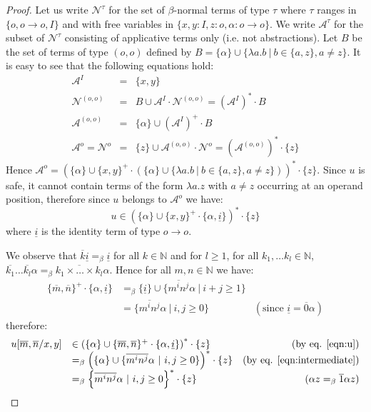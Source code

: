 \documentclass{llncs}
\newcommand{\encode}[1]{\overline{#1}} \newcommand\dps{\displaystyle}
\newcommand\union{\cup}
\newcommand\nat{\mathbb{N}}
\begin{document}
\begin{proof}
Let us write $\mathcal{N}^\tau$ for the set of $\beta$-normal terms of
type $\tau$ where $\tau$ ranges in $\{ o, o\rightarrow o, I \}$ and
with free variables in $\{ x,y:I, z:o, \alpha:o\rightarrow o\}$. We
write $\mathcal{A}^\tau$ for the subset of $\mathcal{N}^\tau$
consisting of applicative terms only (i.e. not abstractions).
Let $B$ be the set of terms of type $(o,o)$ defined by $B = \{ \alpha \} \union \{ \lambda a.b \ | \ b \in \{a,z\}, a \neq z \}$.
It is easy to see that the following equations hold:
\begin{eqnarray*}
\mathcal{A}^I &=& \{ x,y \} \\
\mathcal{N}^{(o,o)} &=& B \union \mathcal{A}^I \cdot
\mathcal{N}^{(o,o)} = (\mathcal{A}^I)^* \cdot B \\
\mathcal{A}^{(o,o)} &=& \{ \alpha \} \union (\mathcal{A}^I)^+ \cdot B \\
\mathcal{A}^o = \mathcal{N}^o &=& \{ z \} \union \mathcal{A}^{(o,o)} \cdot \mathcal{N}^o = (\mathcal{A}^{(o,o)})^* \cdot \{ z \}
\end{eqnarray*}
Hence $\mathcal{A}^o = \left( \{\alpha \} \union \{x,y\}^+ \cdot \left( \{\alpha \} \union \{\lambda a.b \ | \ b \in \{a,z\}, a \neq z \} \right) \right)^* \cdot \{ z \}$.
Since $u$ is safe, it cannot contain terms of the form $\lambda a . z$ with $a \neq z$ occurring at an operand position, therefore since $u$ belongs to $\mathcal{A}^o$ we have:
\begin{equation}
u \in \left( \{\alpha\} \union \{x,y\}^+ \cdot \{\alpha,
\underline{i} \} \right)^* \cdot \{ z \} \label{eqn:u}
\end{equation}
where $\underline{i}$ is the identity term of type $o\rightarrow o$.


We observe that $\encode{k} \underline{i} =_\beta \underline{i}$ for all $k \in \nat$ and for $l\geq 1$, for all $k_1, \ldots k_l \in \nat$,
$\encode{k_1}\ldots \encode{k_l} \alpha =_\beta
\encode{k_1\times \ldots \times k_l} \alpha$. Hence for all $m,n \in \nat$ we have:
\begin{equation}
\begin{array}{llr}
\{\encode{m},\encode{n}\}^+ \cdot \{\alpha, \underline{i} \} &=_\beta
\{ \underline{i} \} \union
\{ \encode{m^i n^j} \alpha \ |\ i+j \geq 1 \} \nonumber \\
&= \{ \encode{m^i n^j} \alpha \ |\ i,j \geq 0 \} & ( \mbox{since } \underline{i} = \encode{0} \alpha) \end{array}
\label{eqn:intermediate}
\end{equation}
therefore:
$$\begin{array}{llr}
u[\encode{m}, \encode{n}/x,y] &\in \left( \{ \alpha \} \union \{\encode{m},\encode{n}\}^+ \cdot \{\alpha, \underline{i} \} \right)^* \cdot \{ z \}  & \mbox{(by eq. \ref{eqn:u})} \\
&=_\beta \left( \{\alpha \} \union \{ \encode{m^i n^j}
\alpha \ | \ i,j \geq 0 \} \right)^* \cdot \{ z \} & \mbox{(by eq. \ref{eqn:intermediate})}  \\
&=_\beta \left\{ \encode{m^i n^j}
\alpha \ | \ i,j \geq 0 \right\}^* \cdot \{ z \} & \mbox{($\alpha z =_\beta \encode{1} \alpha z$)}
\end{array}$$


\end{proof}
\end{document}
